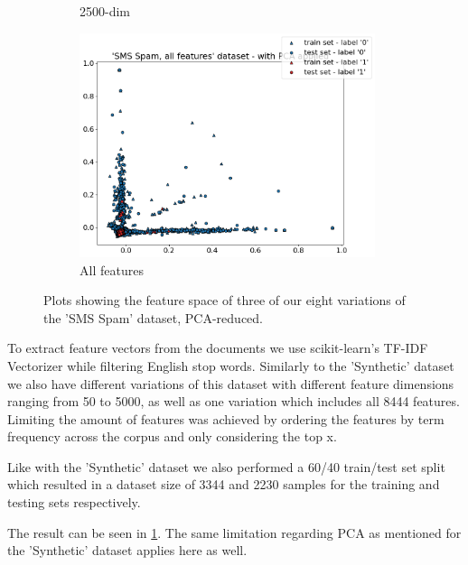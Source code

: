 \begin{figure}[h]
\begin{subfigure}[t]{0.32\textwidth}
        \caption{2500-dim}
    \end{subfigure}
    \begin{subfigure}[t]{0.32\textwidth}
        \centering
        \includegraphics[width=0.95\textwidth]{figures/'SMS Spam, all features' dataset - with PCA applied.png}
        \caption{All features}
    \end{subfigure}
    \caption{Plots showing the feature space of three of our eight variations of the 'SMS Spam' dataset, PCA-reduced.}
    \label{fig:sms_spam_plot}
\end{figure}

To extract feature vectors from the documents we use scikit-learn's TF-IDF Vectorizer while filtering English stop words. Similarly to the 'Synthetic' dataset we also have different variations of this dataset with different feature dimensions ranging from 50 to 5000, as well as one variation which includes all 8444 features. Limiting the amount of features was achieved by ordering the features by term frequency across the corpus and only considering the top x.

Like with the 'Synthetic' dataset we also performed a 60/40 train/test set split which resulted in a dataset size of 3344 and 2230 samples for the training and testing sets respectively.

The result can be seen in \ref{fig:sms_spam_plot}. The same limitation regarding PCA as mentioned for the 'Synthetic' dataset applies here as well.
